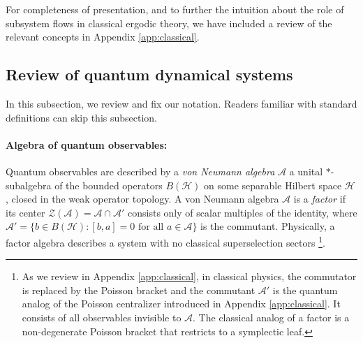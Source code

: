 \documentclass[a4paper,11pt]{article}
\theoremstyle{definition}
\begin{document}
For completeness of presentation, and to further the intuition about the role of subsystem flows in classical ergodic theory, we have included a review of the relevant concepts in Appendix \ref{app:classical}.



\subsection{Review of quantum dynamical systems}

In this subsection, we review and fix our notation. Readers familiar with standard definitions can skip this subsection.

\paragraph{Algebra of quantum observables:}
Quantum observables are described by a 
\emph{von Neumann algebra} $\mathcal{A}$ a unital $*$-subalgebra of the bounded operators
$B(\mathcal{H})$ on some separable Hilbert space $\mathcal{H}$, closed in the
weak operator topology.
A von Neumann algebra $\mathcal{A}$ is a \emph{factor} if its center
$\mathcal{Z}(\mathcal{A}) = \mathcal{A}\cap\mathcal{A}'$ consists only of scalar multiples
of the identity, where $\mathcal{A}' = \{b\in B(\mathcal{H}) : [b,a]=0\text{ for all }a\in\mathcal{A}\}$
is the commutant.  Physically, a factor algebra describes a system with no classical
superselection sectors \footnote{As we review in Appendix \ref{app:classical}, in classical physics, the commutator is replaced by the Poisson bracket and the commutant $\mathcal{A}'$ is the quantum analog of the Poisson
centralizer introduced in Appendix \ref{app:classical}. It consists of all observables invisible to $\mathcal{A}$. The classical analog of a factor is a non-degenerate Poisson bracket that restricts to a symplectic leaf.}.
\end{document}
